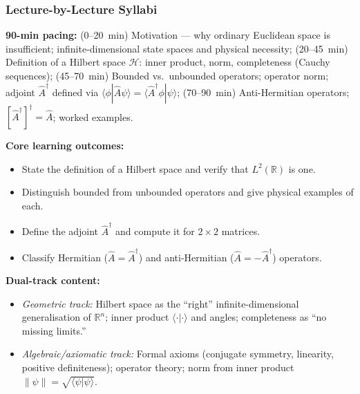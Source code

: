 \documentclass[11pt,a4paper]{article}
\begin{document}
\subsubsection*{Lecture-by-Lecture Syllabi}

\begin{tcolorbox}[modulebox, title={Module~I.1 / L01: The Hilbert Space of Quantum States}]
\textbf{90-min pacing:} (0--20~min) Motivation --- why ordinary Euclidean space is insufficient;
infinite-dimensional state spaces and physical necessity;
(20--45~min) Definition of a Hilbert space $\mathcal{H}$: inner product, norm, completeness (Cauchy sequences);
(45--70~min) Bounded vs.\ unbounded operators; operator norm; adjoint $\hat{A}^\dagger$ defined via
$\langle\phi|\hat{A}\psi\rangle = \langle\hat{A}^\dagger\phi|\psi\rangle$;
(70--90~min) Anti-Hermitian operators; $[\hat{A}^\dagger]^\dagger=\hat{A}$; worked examples.

\medskip\textbf{Core learning outcomes:}
\begin{itemize}[leftmargin=1.4em,topsep=2pt,itemsep=1pt]
  \item State the definition of a Hilbert space and verify that $L^2(\mathbb{R})$ is one.
  \item Distinguish bounded from unbounded operators and give physical examples of each.
  \item Define the adjoint $\hat{A}^\dagger$ and compute it for $2\times 2$ matrices.
  \item Classify Hermitian ($\hat{A}=\hat{A}^\dagger$) and anti-Hermitian ($\hat{A}=-\hat{A}^\dagger$) operators.
\end{itemize}

\medskip\textbf{Dual-track content:}
\begin{itemize}[leftmargin=1.4em,topsep=2pt,itemsep=1pt]
  \item \textit{Geometric track:} Hilbert space as the ``right'' infinite-dimensional generalisation
    of $\mathbb{R}^n$; inner product $\langle\cdot|\cdot\rangle$ and angles; completeness as
    ``no missing limits.''
  \item \textit{Algebraic/axiomatic track:} Formal axioms (conjugate symmetry, linearity, positive
    definiteness); operator theory; norm from inner product $\|\psi\|=\sqrt{\langle\psi|\psi\rangle}$.
\end{itemize}


\end{tcolorbox}
\end{document}
